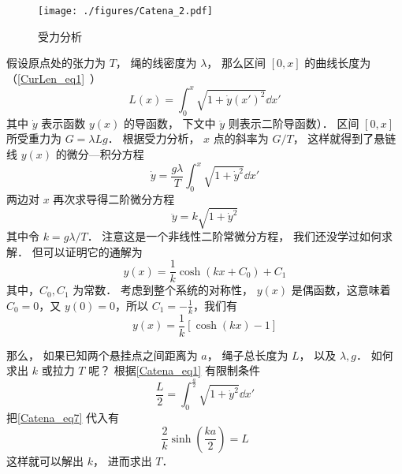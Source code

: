\begin{figure}[ht]
\centering
\texttt{[image: ./figures/Catena\_2.pdf]}
\caption{受力分析} \label{Catena_fig2}
\end{figure}
假设原点处的张力为 $T$， 绳的线密度为 $\lambda$， 那么区间 $[0, x]$ 的曲线长度为（\autoref{CurLen_eq1}~）
\begin{equation}\label{Catena_eq1}
L(x) = \int_0^x \sqrt{1 + \dot y(x')^2} \dd{x'}
\end{equation}
其中 $\dot y$ 表示函数 $y(x)$ 的导函数， 下文中 $\ddot y$ 则表示二阶导函数）． 区间 $[0, x]$ 所受重力为 $G = \lambda L g$． 根据受力分析， $x$ 点的斜率为 $G/T$， 这样就得到了悬链线 $y(x)$ 的微分—积分方程
\begin{equation}
\dot y = \frac{g\lambda}{T} \int_0^x \sqrt{1 + \dot y^2} \dd{x'}
\end{equation}
两边对 $x$ 再次求导得二阶微分方程
\begin{equation}
\ddot y = k \sqrt{1 + \dot y^2}
\end{equation}
其中令 $k = g\lambda/T$． 注意这是一个非线性二阶常微分方程， 我们还没学过如何求解． 但可以证明它的通解为
\begin{equation}\label{Catena_eq2}
y(x) = \frac{1}{k}\cosh(kx+C_0)+C_1
\end{equation}
其中，$C_0,C_1$ 为常数．
考虑到整个系统的对称性， $y(x)$ 是偶函数，这意味着 $C_0=0$，又 $y(0)=0$，所以 $C_1=-\frac{1}{k}$，我们有
\begin{equation}\label{Catena_eq7}
y(x)=\frac{1}{k}[\cosh(kx)-1]
\end{equation}

那么， 如果已知两个悬挂点之间距离为 $a$， 绳子总长度为 $L$， 以及 $\lambda, g$． 如何求出 $k$ 或拉力 $T$ 呢？ 根据\autoref{Catena_eq1} 有限制条件
\begin{equation}
\frac{L}{2} = \int_{0}^{\frac{a}{2}} \sqrt{1 + \dot y^2} \dd{x'}
\end{equation}
把\autoref{Catena_eq7} 代入有
\begin{equation}
\frac{2}{k}\sinh(\frac{ka}{2}) = L
\end{equation}
这样就可以解出 $k$， 进而求出 $T$．


